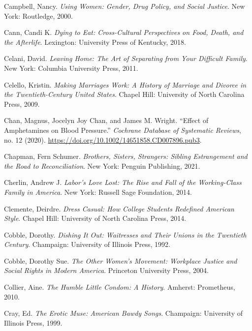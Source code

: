 \documentclass[
  letterpaper,
]{book}
\newlength{\cslhangindent}
\newenvironment{CSLReferences}[2] %
 {\begin{list}{}{%
  \setlength{\itemindent}{0pt}
  \setlength{\leftmargin}{0pt}
  \setlength{\parsep}{0pt}
  \ifodd #1
   \setlength{\leftmargin}{\cslhangindent}
   \setlength{\itemindent}{-1\cslhangindent}
  \fi
  \setlength{\itemsep}{#2\baselineskip}}}
 {\end{list}}
\begin{document}
\begin{CSLReferences}{1}{0}
Campbell, Nancy. \emph{Using Women: Gender, Drug Policy, and Social
Justice}. New York: Routledge, 2000.

Cann, Candi K. \emph{Dying to Eat: Cross-Cultural Perspectives on Food,
Death, and the Afterlife}. Lexington: University Press of Kentucky,
2018.

Celani, David. \emph{Leaving Home: The Art of Separating from Your
Difficult Family}. New York: Columbia University Press, 2011.

Celello, Kristin. \emph{Making Marriages Work: A History of Marriage and
Divorce in the Twentieth-Century United States}. Chapel Hill: University
of North Carolina Press, 2009.

Chan, Magnus, Jocelyn Joy Chan, and James M. Wright. {``Effect of
Amphetamines on Blood Pressure.''} \emph{Cochrane Database of Systematic
Reviews}, no. 12 (2020).
\url{https://doi.org/10.1002/14651858.CD007896.pub3}.

Chapman, Fern Schumer. \emph{Brothers, Sisters, Strangers: Sibling
Estrangement and the Road to Reconciliation}. New York: Penguin
Publishing, 2021.

Cherlin, Andrew J. \emph{Labor's Love Lost: The Rise and Fall of the
Working-Class Family in America}. New York: Russell Sage Foundation,
2014.

Clemente, Deirdre. \emph{Dress Casual: How College Students Redefined
American Style}. Chapel Hill: University of North Carolina Press, 2014.

Cobble, Dorothy. \emph{Dishing It Out: Waitresses and Their Unions in
the Twentieth Century}. Champaign: University of Illinois Press, 1992.

Cobble, Dorothy Sue. \emph{The Other Women's Movement: Workplace Justice
and Social Rights in Modern America}. Princeton University Press, 2004.

Collier, Aine. \emph{The Humble Little Condom: A History}. Amherst:
Prometheus, 2010.

Cray, Ed. \emph{The Erotic Muse: American Bawdy Songs}. Champaign:
University of Illinois Press, 1999.


\end{CSLReferences}
\end{document}
